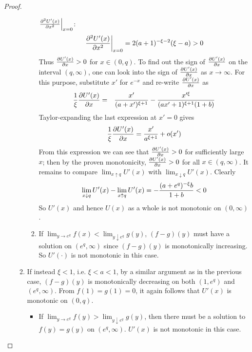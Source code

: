\documentclass[11pt,a4]{amsart}
\newcommand{\pd}{\partial}
\newcommand{\1}{{\mathbf 1}}
\begin{document}
\begin{proof}
\begin{enumerate}
\begin{enumerate}
\begin{enumerate}
        $\left.{\pd^2 U'(x) \over \pd x^2}\right|_{x=0}$:
        \[
        \left.{\pd^2 U'(x) \over \pd x^2}\right|_{x=0} =
        2 (a + 1)^{-\xi - 2} (\xi - a) > 0
        \]
        Thus ${\pd U'(x) \over \pd x} > 0$ for $x \in (0, q)$.
        To find out the sign of
        ${\pd U'(x) \over \pd x}$ on the interval $(q, \infty)$,
        one can look into the sign of ${\pd U'(x) \over \pd x}$
        as $x \to \infty$. For
        this purpose, substitute $x'$ for $e^{-x}$ and re-write
        ${\pd U'(x) \over \pd x}$ as
        \begin{eqnarray*}
          {1 \over \xi}
          {\pd U'(x) \over \pd x} &=& {x' \over (a + x')^{\xi + 1}}
          - {x'^\xi \over (a x' + 1)^{\xi + 1} (1 + b)}
        \end{eqnarray*}
        Taylor-expanding the last expression at $x'=0$ gives
        \[
          {1 \over \xi}
          {\pd U'(x) \over \pd x}
         = {x' \over a^{\xi + 1}} + o(x')
        \]
        From this expression we can see that
        ${\pd U'(x) \over \pd x} > 0$ for
        sufficiently large $x$; then by the proven monotonicity,
        ${\pd U'(x) \over \pd x} > 0$ for all $x \in (q, \infty)$.
        It remains to compare $\lim_{x\uparrow q}U'(x)$ with
        $\lim_{x\downarrow q}U'(x)$. Clearly
        \[
        \lim_{x\downarrow q}U'(x) - \lim_{x\uparrow q}U'(x) = - {
          (a + e^q)^{-\xi} b
          \over
          1+ b
        } < 0
        \]
        So $U'(x)$ and hence $U(x)$ as a whole is not monotonic on $(0, \infty)$.

      \item If $ \lim_{y \to e^q}f(x) < \lim_{y \downarrow e^q} g(y)$,
        $(f - g)(y)$ must have a solution on
        $(e^q, \infty)$ since $(f-g)(y)$ is monotonically
        increasing. So $U'(\cdot)$ is not monotonic in this case.
      \end{enumerate}
      
    \item If instead $\xi < 1$, i.e. $\xi < a < 1$, by a similar argument as in the
      previous case, $(f - g)(y)$ is monotonically decreasing on both
      $(1, e^q)$ and $(e^q, \infty)$. From $f(1) = g(1) = 0$, it again
      follows that $U'(x)$ is monotonic on $(0, q)$.
      \begin{itemize}
      \item
        If $ \lim_{y \to e^q} f(y) > \lim_{y \downarrow e^q} g(y)$,
        then there must be a solution to $f(y) = g(y)$ on $(e^q,
        \infty)$. $U'(x)$ is not monotonic in this case.


\end{itemize}
\end{enumerate}
\end{enumerate}
\end{proof}
\end{document}
